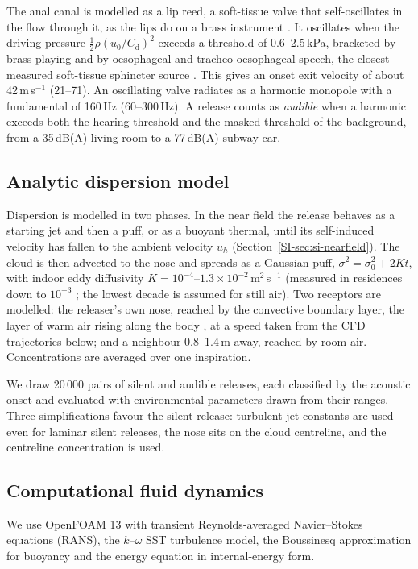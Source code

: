 The anal canal is modelled as a lip reed, a soft-tissue valve that self-oscillates in the flow through it, as the
lips do on a brass instrument \cite{ancalle2021}. It oscillates when the driving pressure
$\tfrac12\rho(u_0/C_\mathrm{d})^2$ exceeds a threshold of 0.6--2.5\,kPa, bracketed by brass playing
\cite{matteoli2021} and by oesophageal and tracheo-oesophageal speech, the closest measured soft-tissue sphincter
source \cite{nagai1993,grolman2007,ng2011}.
This gives an onset exit velocity of about 42\,m\,s$^{-1}$ (21--71). An oscillating valve radiates as a harmonic
monopole with a fundamental of 160\,Hz (60--300\,Hz). A release counts as \emph{audible} when a harmonic exceeds both
the hearing threshold \cite{iso226_2023} and the masked threshold of the background, from a 35\,dB(A) living room to
a 77\,dB(A) subway car.

\subsection{Analytic dispersion model}
\label{sec:gate0}
Dispersion is modelled in two phases. In the near field the release behaves as a starting jet and then a puff, or as
a buoyant thermal, until its self-induced velocity has fallen to the ambient velocity $u_h$
(Section~\ref{SI-sec:si-nearfield}). The cloud is then advected to the nose and spreads as a Gaussian puff,
$\sigma^2 = \sigma_0^2 + 2Kt$, with indoor eddy diffusivity $K = 10^{-4}$--$1.3\times10^{-2}$\,m$^2$\,s$^{-1}$ (measured in
residences down to $10^{-3}$ \cite{cheng2011}; the lowest decade is assumed for still air). Two receptors are modelled: the releaser's own nose, reached by the convective boundary layer, the
layer of warm air rising along the body \cite{licina2014}, at a speed taken from the CFD trajectories below; and a
neighbour 0.8--1.4\,m away, reached by room air. Concentrations are averaged over one inspiration.

We draw 20\,000 pairs of silent and audible releases, each classified by the acoustic onset and evaluated with
environmental parameters drawn from their ranges. Three simplifications favour the silent release: turbulent-jet
constants are used even for laminar silent releases, the nose sits on the cloud centreline, and the centreline
concentration is used.

\subsection{Computational fluid dynamics}
\label{sec:cfd}
We use OpenFOAM 13 with transient Reynolds-averaged Navier--Stokes equations (RANS), the $k$--$\omega$ SST turbulence
model, the Boussinesq approximation for buoyancy and the energy equation in internal-energy form.

